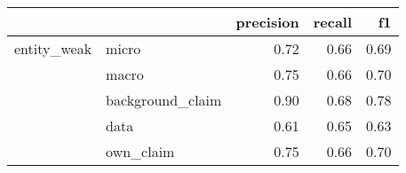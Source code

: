 \begin{tabular}{llrrr}
\toprule
            &           &  precision &  recall &   f1 \\
\midrule
entity\_weak & micro &       0.72 &    0.66 & 0.69 \\
            & macro &       0.75 &    0.66 & 0.70 \\
            & background\_claim &       0.90 &    0.68 & 0.78 \\
            & data &       0.61 &    0.65 & 0.63 \\
            & own\_claim &       0.75 &    0.66 & 0.70 \\
\bottomrule
\end{tabular}
